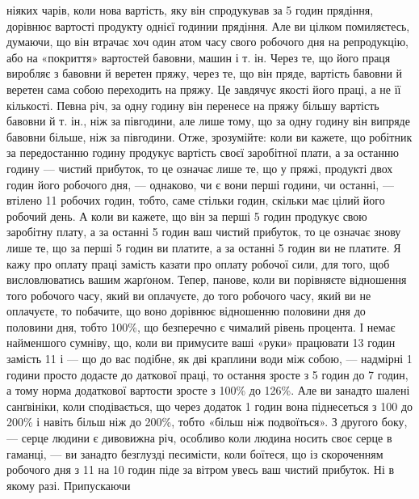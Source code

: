\parcont{}  %
ніяких чарів, коли нова вартість, яку він спродукував за 5 годин прядіння, дорівнює вартості
продукту однієї годинии прядіння. Але ви цілком помиляєтесь, думаючи, що він втрачає хоч один атом
часу свого робочого дня на репродукцію, або на «покриття» вартостей бавовни, машин і т. ін. Через
те, що його праця виробляє з бавовни й веретен пряжу, через те, що він пряде, вартість бавовни й
веретен сама собою переходить на пряжу. Це завдячує якості його праці, а не її кількості. Певна річ, за одну годину він перенесе на пряжу
більшу вартість бавовни й т. ін., ніж за півгодини, але лише тому, що за одну годину він випряде
бавовни більше, ніж за півгодини. Отже, зрозумійте: коли ви кажете, що робітник за передостанню
годину продукує вартість своєї заробітної плати, а за останню годину — чистий прибуток, то це
означає лише те, що у пряжі, продукті двох годин його робочого дня, — однаково, чи є вони перші
години, чи останні, — втілено 11 робочих годин, тобто, саме стільки годин, скільки має цілий
його робочий день. А коли ви кажете, що він за перші 5 годин продукує свою заробітну плату, а за
останні 5 годин ваш чистий прибуток, то це означає знову лише те, що за перші 5 годин ви
платите, а за останні 5 годин
ви не платите. Я кажу про оплату праці замість казати про оплату робочої сили, для того, щоб
висловлюватись вашим жарґоном. Тепер, панове, коли ви порівняєте відношення того робочого
часу, який ви оплачуєте, до того робочого часу, який ви не оплачуєте, то побачите, що воно дорівнює
відношенню половини дня до половини дня, тобто 100\%, що безперечно є чималий рівень процента. І
немає найменшого сумніву, що, коли ви примусите ваші «руки» працювати 13 годин замість 11 і — що
до вас подібне, як дві краплини води між собою, — надмірні 1 години просто додасте до даткової
праці, то остання зросте з 5 годин до 7 годин, а тому норма додаткової вартости зросте з
100\% до 126\%. Але ви занадто шалені санґвініки, коли сподівається, що через додаток 1 годин
вона піднесеться з 100 до 200\% і навіть більш ніж до 200\%, тобто «більш ніж подвоїться». З другого
боку, — серце людини є дивовижна річ, особливо коли людина носить своє серце в гаманці, — ви занадто
безглузді песимісти, коли боїтеся, що із скороченням робочого
дня з 11 на 10 годин піде за вітром увесь ваш чистий прибуток. Ні в якому разі. Припускаючи
